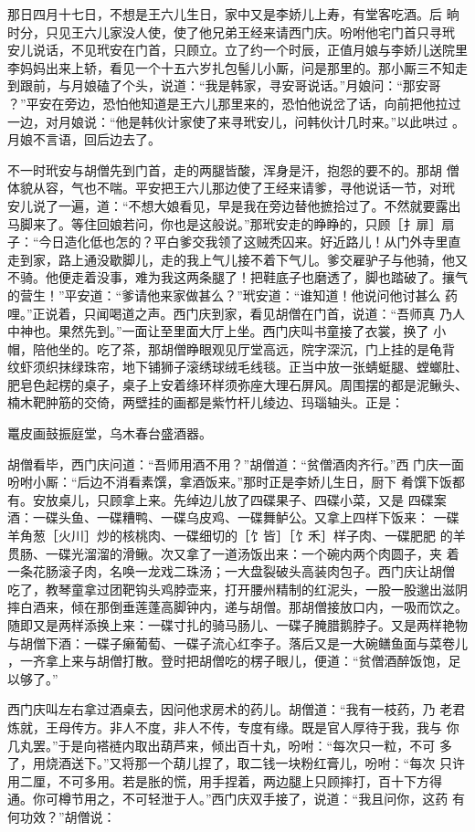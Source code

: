 那日四月十七日，不想是王六儿生日，家中又是李娇儿上寿，有堂客吃酒。后
晌时分，只见王六儿家没人使，使了他兄弟王经来请西门庆。吩咐他宅门首只寻玳
安儿说话，不见玳安在门首，只顾立。立了约一个时辰，正值月娘与李娇儿送院里
李妈妈出来上轿，看见一个十五六岁扎包髻儿小厮，问是那里的。那小厮三不知走
到跟前，与月娘磕了个头，说道：“我是韩家，寻安哥说话。”月娘问：“那安哥
？”平安在旁边，恐怕他知道是王六儿那里来的，恐怕他说岔了话，向前把他拉过
一边，对月娘说：“他是韩伙计家使了来寻玳安儿，问韩伙计几时来。”以此哄过
。月娘不言语，回后边去了。

不一时玳安与胡僧先到门首，走的两腿皆酸，浑身是汗，抱怨的要不的。那胡
僧体貌从容，气也不喘。平安把王六儿那边使了王经来请爹，寻他说话一节，对玳
安儿说了一遍，道：“不想大娘看见，早是我在旁边替他摭拾过了。不然就要露出
马脚来了。等住回娘若问，你也是这般说。”那玳安走的睁睁的，只顾［扌扉］扇
子：“今日造化低也怎的？平白爹交我领了这贼秃囚来。好近路儿！从门外寺里直
走到家，路上通没歇脚儿，走的我上气儿接不着下气儿。爹交雇驴子与他骑，他又
不骑。他便走着没事，难为我这两条腿了！把鞋底子也磨透了，脚也踏破了。攘气
的营生！”平安道：“爹请他来家做甚么？”玳安道：“谁知道！他说问他讨甚么
药哩。”正说着，只闻喝道之声。西门庆到家，看见胡僧在门首，说道：“吾师真
乃人中神也。果然先到。”一面让至里面大厅上坐。西门庆叫书童接了衣裳，换了
小帽，陪他坐的。吃了茶，那胡僧睁眼观见厅堂高远，院字深沉，门上挂的是龟背
纹虾须织抹绿珠帘，地下铺狮子滚绣球绒毛线毯。正当中放一张蜻蜓腿、螳螂肚、
肥皂色起楞的桌子，桌子上安着绦环样须弥座大理石屏风。周围摆的都是泥鳅头、
楠木靶肿筋的交倚，两壁挂的画都是紫竹杆儿绫边、玛瑙轴头。正是：

鼍皮画鼓振庭堂，乌木春台盛酒器。

胡僧看毕，西门庆问道：“吾师用酒不用？”胡僧道：“贫僧酒肉齐行。”西
门庆一面吩咐小厮：“后边不消看素馔，拿酒饭来。”那时正是李娇儿生日，厨下
肴馔下饭都有。安放桌儿，只顾拿上来。先绰边儿放了四碟果子、四碟小菜，又是
四碟案酒：一碟头鱼、一碟糟鸭、一碟乌皮鸡、一碟舞鲈公。又拿上四样下饭来：
一碟羊角葱［火川］炒的核桃肉、一碟细切的［饣皆］［饣禾］样子肉、一碟肥肥
的羊贯肠、一碟光溜溜的滑鳅。次又拿了一道汤饭出来：一个碗内两个肉圆子，夹
着一条花肠滚子肉，名唤一龙戏二珠汤；一大盘裂破头高装肉包子。西门庆让胡僧
吃了，教琴童拿过团靶钩头鸡脖壶来，打开腰州精制的红泥头，一股一股邈出滋阴
摔白酒来，倾在那倒垂莲蓬高脚钟内，递与胡僧。那胡僧接放口内，一吸而饮之。
随即又是两样添换上来：一碟寸扎的骑马肠儿、一碟子腌腊鹅脖子。又是两样艳物
与胡僧下酒：一碟子癞葡萄、一碟子流心红李子。落后又是一大碗鳝鱼面与菜卷儿
，一齐拿上来与胡僧打散。登时把胡僧吃的楞子眼儿，便道：“贫僧酒醉饭饱，足
以够了。”

西门庆叫左右拿过酒桌去，因问他求房术的药儿。胡僧道：“我有一枝药，乃
老君炼就，王母传方。非人不度，非人不传，专度有缘。既是官人厚待于我，我与
你几丸罢。”于是向褡裢内取出葫芦来，倾出百十丸，吩咐：“每次只一粒，不可
多了，用烧酒送下。”又将那一个葫儿捏了，取二钱一块粉红膏儿，吩咐：“每次
只许用二厘，不可多用。若是胀的慌，用手捏着，两边腿上只顾摔打，百十下方得
通。你可樽节用之，不可轻泄于人。”西门庆双手接了，说道：“我且问你，这药
有何功效？”胡僧说：

